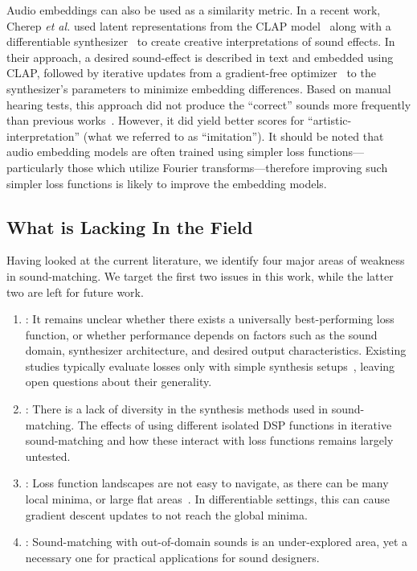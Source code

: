  Audio embeddings can also be used as a similarity metric. In a recent work, Cherep \textit{et al.} used latent representations from the CLAP model~\cite{wu2023large} along with a differentiable synthesizer~\cite{synthhaxcherep2023} to create creative interpretations of sound effects. In their approach, a desired sound-effect is described in text and embedded using CLAP, followed by iterative updates from a gradient-free optimizer~\cite{evosax2022github} to the synthesizer's parameters to minimize embedding differences. Based on manual hearing tests, this approach did not produce the ``correct'' sounds more frequently than previous works~\cite{kreuk2022audiogen}. However, it did yield better scores for ``artistic-interpretation'' (what we referred to as ``imitation''). It should be noted that audio embedding models are often trained using simpler loss functions---particularly those which utilize Fourier transforms---therefore improving such simpler loss functions is likely to improve the embedding models.


\subsection{What is Lacking In the Field}
\label{sec:lacking}

Having looked at the current literature, we identify four major areas of weakness in sound-matching. We target the first two issues in this work, while the latter two are left for future work.
\begin{enumerate}
    \item \LossSelect: It remains unclear whether there exists a universally best-performing loss function, 
    or whether performance depends on factors such as the sound domain, synthesizer architecture, 
    and desired output characteristics. Existing studies typically evaluate losses only with simple synthesis 
    setups~\cite{vahidi2023mesostructures}, leaving open questions about their generality. 
    \item \SynthSelect: There is a lack of diversity in the synthesis methods used in sound-matching. The effects of using different isolated DSP functions in iterative sound-matching and how these interact with loss functions remains largely untested.
    \item \PeriodicLoss: Loss function landscapes are not easy to navigate, as there can be many local minima, or large flat areas~\cite{turian2020sorry,vahidi2023mesostructures}.  In differentiable settings, this can cause gradient descent updates to not reach the global minima. 
    \item \OutDomain: Sound-matching with out-of-domain sounds is an under-explored area, yet a necessary one for practical applications for sound designers.
\end{enumerate}

